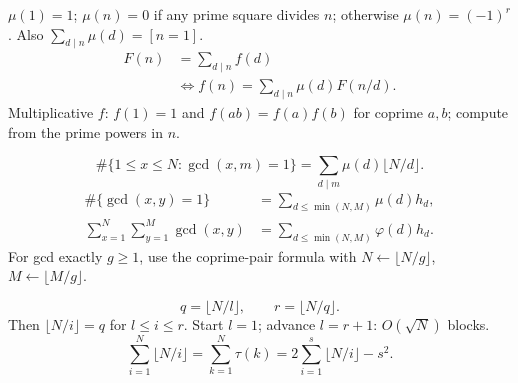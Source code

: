 $\mu(1)=1$; $\mu(n)=0$ if any prime square divides $n$;
otherwise $\mu(n)=(-1)^r$.
Also $\sum_{d\mid n}\mu(d)=[n=1]$.
\[
 \begin{aligned}
 F(n)&=\textstyle\sum_{d\mid n}f(d)\\
 &\iff f(n)=\textstyle\sum_{d\mid n}\mu(d)F(n/d).
 \end{aligned}
\]
Multiplicative $f$: $f(1)=1$ and $f(ab)=f(a)f(b)$ for coprime
$a,b$; compute from the prime powers in $n$.

\[
 \#\{1\le x\le N:\gcd(x,m)=1\}
 =\textstyle\sum_{d\mid m}\mu(d)\lfloor N/d\rfloor.
\]
\[
 \begin{aligned}
 \#\{\gcd(x,y)=1\}&=\textstyle\sum_{d\le\min(N,M)}\mu(d)h_d,\\
 \textstyle\sum_{x=1}^N\sum_{y=1}^M\gcd(x,y)
 &=\textstyle\sum_{d\le\min(N,M)}\varphi(d)h_d.
 \end{aligned}
\]
For gcd exactly $g\ge1$, use the coprime-pair formula with
$N\leftarrow\lfloor N/g\rfloor$, $M\leftarrow\lfloor M/g\rfloor$.

\[
 q=\lfloor N/l\rfloor,\qquad r=\lfloor N/q\rfloor.
\]
Then $\lfloor N/i\rfloor=q$ for $l\le i\le r$.
Start $l=1$; advance $l=r+1$: $O(\sqrt N)$ blocks.
\[
 \textstyle\sum_{i=1}^N\lfloor N/i\rfloor
 =\sum_{k=1}^N\tau(k)
 =2\sum_{i=1}^{s}\lfloor N/i\rfloor-s^2.
\]
